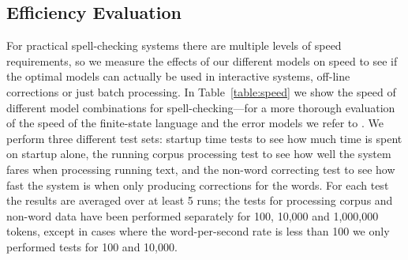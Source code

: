 \documentclass[a4paper,12pt]{article}
\begin{document}
%


%


\subsection{Efficiency Evaluation}
\label{subsec:efficiency}

For practical spell-checking systems there are multiple levels of speed
requirements, so we measure the effects of our different models on speed to see
if the optimal models can actually be used in interactive systems, off-line
corrections or just batch processing. In Table~\ref{table:speed} we show the
speed of different model combinations for spell-checking---for a more thorough
evaluation of the speed of the finite-state language and the error models we
refer to \cite{pirinen2012improving}. We perform three different test sets:
startup time tests to see how much time is spent on startup alone, the running
corpus processing test to see how well the system fares when processing running
text, and the non-word correcting test to see how fast the system is when only
producing corrections for the words. For each test the results are averaged
over at least 5 runs; the tests for processing corpus and non-word data have
been performed separately for 100, 10,000 and 1,000,000 tokens, except in cases
where the word-per-second rate is less than 100 we only performed tests for 100
and 10,000.
\end{document}
